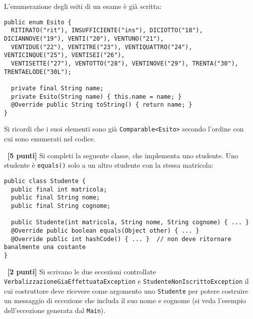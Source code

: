 \documentclass{article}[10pt]
\newcounter{esnu}
\newenvironment{esercizio}{\medskip \noindent {\bf Esercizio\addtocounter{esnu}{1} \arabic{esnu}}}{}
\begin{document}
L'enumerazione degli esiti di un esame \`e gi\`a scritta:
%
\begin{lstlisting}
public enum Esito {
  RITIRATO("rit"), INSUFFICIENTE("ins"), DICIOTTO("18"), DICIANNOVE("19"), VENTI("20"), VENTUNO("21"),
  VENTIDUE("22"), VENTITRE("23"), VENTIQUATTRO("24"), VENTICINQUE("25"), VENTISEI("26"),
  VENTISETTE("27"), VENTOTTO("28"), VENTINOVE("29"), TRENTA("30"), TRENTAELODE("30L");

  private final String name;
  private Esito(String name) { this.name = name; }
  @Override public String toString() { return name; }
}
\end{lstlisting}
%
Si ricordi che i suoi elementi sono gi\`a \texttt{Comparable<Esito>} secondo l'ordine
con cui sono enumerati nel codice.

\begin{esercizio}~\textbf{[5 punti]}
Si completi la seguente classe, che implementa uno studente. Uno studente \`e
\texttt{equals()} solo a un altro studente con la stessa matricola:
%
\begin{lstlisting}
public class Studente {
  public final int matricola;
  public final String nome;
  public final String cognome;
 
  public Studente(int matricola, String nome, String cognome) { ... }
  @Override public boolean equals(Object other) { ... }
  @Override public int hashCode() { ... }  // non deve ritornare banalmente una costante
}
\end{lstlisting}
%
\end{esercizio}

\begin{esercizio}~\textbf{[2 punti]}
  Si scrivano le due
  eccezioni controllate \texttt{VerbalizzazioneGiaEffettuataException}
  e \texttt{StudenteNonIscrittoException} il cui costruttore deve ricevere come argomento uno
  \texttt{Studente} per potere costruire un messaggio di eccezione che includa il suo nome e
  cognome (si veda l'esempio dell'eccezione generata dal \texttt{Main}).
\end{esercizio}
\end{document}
